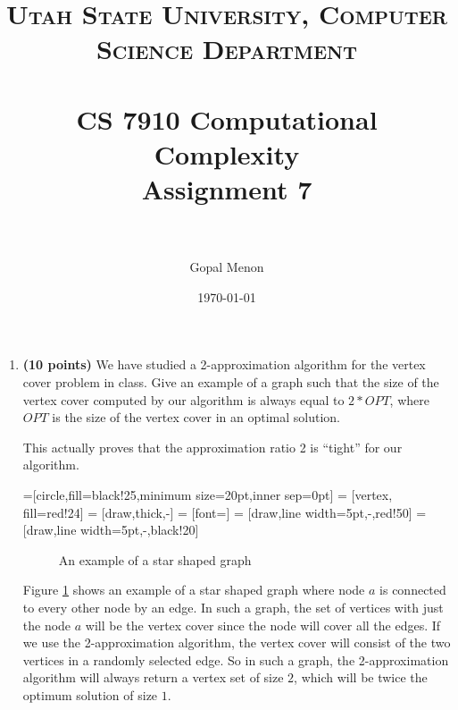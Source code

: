 \documentclass[paper=a4, fontsize=11pt]{scrartcl} %
\title{	
\normalfont \normalsize 
\textsc{Utah State University, Computer Science Department} \\ [25pt] %
\horrule{0.5pt} \\[0.4cm] %
\huge CS 7910 Computational Complexity\\Assignment 7 \\ %
\horrule{2pt} \\[0.5cm] %
}
\author{Gopal Menon} %
\date{\normalsize\today} %
\numberwithin{figure}{section} %
\numberwithin{table}{section} %
\begin{document}
\maketitle %

\begin{enumerate}
\item \textbf{(10 points)} We have studied a 2-approximation algorithm for the vertex cover problem in class. Give an example of a graph such that the size of the vertex cover computed by our algorithm is always equal to $2 * OPT$, where $OPT$ is the size of the vertex cover in an optimal solution.

This actually proves that the approximation ratio 2 is \enquote{tight} for our algorithm.
\begin{comment}

\end{comment}

\begin{frame}

=[circle,fill=black!25,minimum size=20pt,inner sep=0pt]
 = [vertex, fill=red!24]
 = [draw,thick,-]
 = [font=\small]
 = [draw,line width=5pt,-,red!50]
 = [draw,line width=5pt,-,black!20]

\begin{figure}[hb]
\centering
{}
\caption{An example of a star shaped graph}
\label{StarGraph}
\end{figure}


\end{frame}

Figure \ref{StarGraph} shows an example of a star shaped graph where node $a$ is connected to every other node by an edge. In such a graph, the set of vertices with just the node $a$ will be the vertex cover since the node will cover all the edges. If we use the 2-approximation algorithm, the vertex cover will consist of the two vertices in a randomly selected edge. So in such a graph, the 2-approximation algorithm will always return a vertex set of size $2$, which will be twice the optimum solution of size $1$. 


\end{enumerate}
\end{document}
